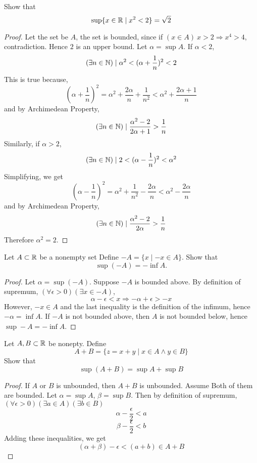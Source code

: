 \begin{problems}
\item Show that
    \[ \sup \{ x \in {\mathbb{R}} \mid x^2 < 2 \} = \sqrt{2}\]
    \begin{proof}
        Let the set be $A$, the set is bounded, since if $(x \in A) \ x > 2 \Rightarrow x^4 > 4$, contradiction. Hence $2$
        is an upper bound.
        Let $\alpha = \sup A$. If $\alpha < 2$,
        \[(\exists n \in {\mathbb{N}}) \mid \alpha ^2 < (\alpha +\frac{1}{n})^2 < 2 \]
        This is true because,
        \[ (\alpha + \frac{1}{n})^2 = \alpha^2 + \frac{2\alpha}{n} +\frac{1}{n^2} < \alpha^2 + \frac{2\alpha+1}{n}\]
        and by Archimedean Property,
        \[ (\exists n \in {\mathbb{N}}) \mid \frac{\alpha^2 -2}{2\alpha + 1} > \frac{1}{n} \]
        Similarly, if $\alpha > 2$,
        \[ (\exists n \in {\mathbb{N}}) \mid 2 < (\alpha - \frac{1}{n})^2<\alpha^2\]
        Simplifying, we get
        \[ (\alpha - \frac{1}{n})^2 = \alpha ^2 + \frac{1}{n^2} - \frac{2\alpha}{n} < \alpha ^2  - \frac{2\alpha}{n}\]
        and by Archimedean Property,
        \[(\exists n \in {\mathbb{N}}) \mid \frac{\alpha^2 - 2}{2\alpha} > \frac{1}{n}\]
        Therefore $\alpha^2 = 2$.
    \end{proof}
\item Let $A \subset {\mathbb{R}}$ be a nonempty set Define $-A = \{ x \mid -x \in A\}$. Show that
    \[ \sup(-A) = - \inf A.\]
    \begin{proof}
        Let $\alpha = \sup(- A)$. Suppose $-A$ is bounded above. By definition of supremum, $(\forall \epsilon > 0)(\exists x \in -A)$,
        \[ \alpha - \epsilon < x \Rightarrow - \alpha + \epsilon > -x\]
        However, $-x \in A$ and the last inequality is the definition of the infimum, hence $- \alpha = \inf A$.
        If $-A$ is not bounded
        above, then $A$ is not bounded below, hence $\sup -A = - \inf A$.
    \end{proof}
\item Let $A,B \subset {\mathbb{R}}$ be nonepty. Define
    \[ A + B = \{ z = x+y \mid x \in A \land y \in B\}\]
    Show that
    \[ \sup (A+B) = \sup A + \sup B\]
    \begin{proof}
        If $A$ or $B$ is unbounded, then $A+B$ is unbounded. Assume Both of them are bounded.
        Let $\alpha = \sup A$, $\beta = \sup B$. Then by definition of supremum, $(\forall \epsilon > 0)(\exists a \in A)(\exists b \in B)$
        \[ \alpha - \frac{\epsilon}{2} < a\]
        \[ \beta - \frac{\epsilon}{2} < b\]
        Adding these inequalities, we get
        \[ (\alpha + \beta) - \epsilon < (a+b) \in A+B\]

\end{proof}
\end{problems}
